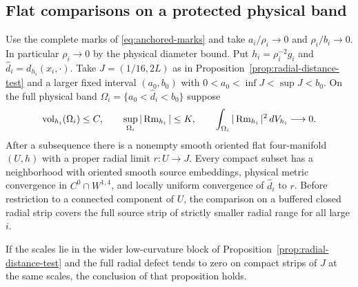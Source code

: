 \subsection{Flat comparisons on a protected physical band}
\label{subsec:protected-physical-window}

\begin{proposition}
\label{prop:protected-physical-window}
Use the complete marks of \eqref{eq:anchored-marks} and take
\(a_i/\rho_i\to0\) and \(\rho_i/b_i\to0\). In particular
\(\rho_i\to0\) by the physical diameter bound. Put
\(h_i=\rho_i^{-2}g_i\) and \(\widehat d_i=d_{h_i}(x_i,\cdot)\).
Take \(J=(1/16,2L)\) as in Proposition~\ref{prop:radial-distance-test}
and a larger fixed interval \((a_0,b_0)\) with
\(0<a_0<\inf J<\sup J<b_0\). On the full physical band
\(\Omega_i=\{a_0<\widehat d_i<b_0\}\) suppose
\[
 \operatorname{vol}_{h_i}(\Omega_i)\le C,\qquad
 \sup_{\Omega_i}|\operatorname{Rm}_{h_i}|\le K,\qquad
 \int_{\Omega_i}|\operatorname{Rm}_{h_i}|^2\,dV_{h_i}\longrightarrow0.
\]
After a subsequence there is a nonempty smooth oriented flat
four-manifold \((U,h)\) with a proper radial limit \(r:U\to J\).
Every compact subset has a neighborhood with oriented smooth
source embeddings, physical metric convergence in \(C^0\cap W^{1,4}\),
and locally uniform convergence of \(\widehat d_i\) to \(r\).
Before restriction to a connected component of \(U\), the comparison
on a buffered closed radial strip covers the full source strip of
strictly smaller radial range for all large \(i\).

If the scales lie in the wider low-curvature block of
Proposition~\ref{prop:radial-distance-test} and the full radial
defect tends to zero on compact strips of \(J\) at the same
scales, the conclusion of that proposition holds.
\end{proposition}

